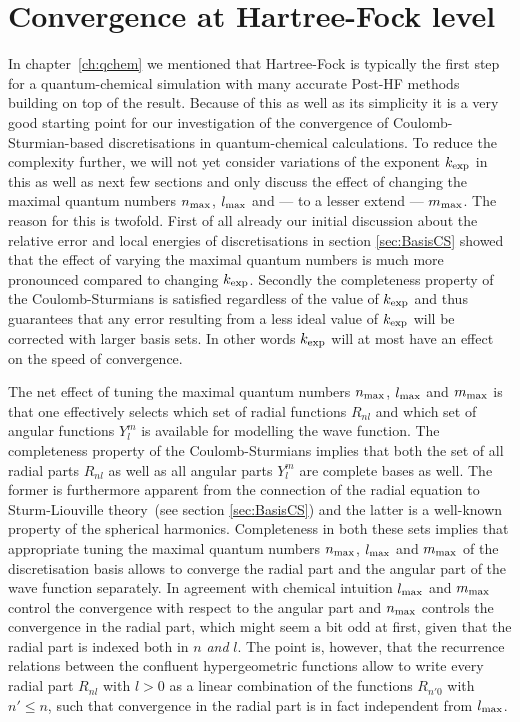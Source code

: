 \section{Convergence at Hartree-Fock level}
\label{sec:CSconvergenceHF}
In chapter~\vref{ch:qchem} we mentioned that Hartree-Fock
is typically the first step for a quantum-chemical simulation
with many accurate Post-HF methods building on top of the \HF result.
Because of this as well as its simplicity it is a very good
starting point for our investigation of the convergence
of Coulomb-Sturmian-based discretisations in quantum-chemical calculations.
To reduce the complexity further,
we will not yet consider variations of the \CS exponent $k_\text{exp}$ in this as well as
next few sections
and only discuss the effect of changing the maximal quantum numbers
$n_\text{max}$, $l_\text{max}$ and --- to a lesser extend --- $m_\text{max}$.
The reason for this is twofold.
First of all already our initial discussion
about the relative error and local energies of \CS discretisations
in section \vref{sec:BasisCS}
showed that the effect of varying the maximal quantum numbers
is much more pronounced compared to changing $k_\text{exp}$.
Secondly the completeness property of the Coulomb-Sturmians
is satisfied regardless of the value of $k_\text{exp}$
and thus guarantees that any error resulting from a less ideal
value of $k_\text{exp}$ will be corrected with larger basis sets.
In other words $k_\text{exp}$ will at most have an effect on the speed of convergence.

The net effect of tuning the maximal quantum numbers $n_\text{max}$, $l_\text{max}$ and $m_\text{max}$
is that one effectively selects which set of radial functions $R_{nl}$
and which set of angular functions $Y_l^m$ is available for modelling the wave function.
The completeness property of the Coulomb-Sturmians
implies that both the set of all
radial parts $R_{nl}$ as well as all angular parts $Y_l^m$ are complete bases as well.
The former is furthermore apparent from the connection of the \CS radial equation
to Sturm-Liouville theory~(see section \vref{sec:BasisCS})
and the latter is a well-known property of the spherical harmonics.
Completeness in both these sets implies
that appropriate tuning the maximal quantum numbers $n_\text{max}$, $l_\text{max}$ and $m_\text{max}$
of the discretisation basis
allows to converge the radial part and the angular part of the wave function separately.
In agreement with chemical intuition
$l_\text{max}$ and $m_\text{max}$ control the convergence with respect to the angular part
and $n_\text{max}$ controls the convergence in the radial part,
which might seem a bit odd at first, given that the radial
part is indexed both in $n$ \emph{and} $l$.
The point is, however, that the recurrence relations between the
confluent hypergeometric functions
allow to write every radial part $R_{nl}$ with $l>0$
as a linear combination of the functions $R_{n'0}$ with $n' \leq n$,
such that convergence in the radial part is in fact independent from $l_\text{max}$.

